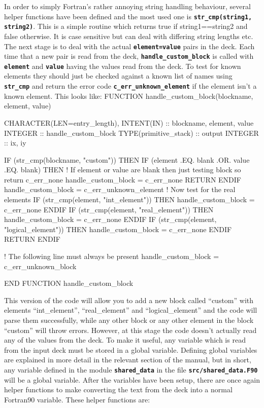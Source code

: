 \documentclass[12pt,a4paper]{article}
\newcommand{\inlinecode}[1]{{\color{warwickred} \bf\texttt{#1}}}
\newenvironment{boxverbatim}{\lboxverbatim{none}}{\endlboxverbatim}
\begin{document}
In order to simply Fortran's rather annoying string handling behaviour, several
helper functions have been defined and the most used one is
\inlinecode{str\_cmp(string1, string2)}. This is a simple routine which returns
true if string1==string2 and false otherwise. It is case sensitive but can
deal with differing string lengths etc. The next stage is to deal with the
actual \inlinecode{element=value} pairs in the deck. Each time that a new pair
is read from the deck, \inlinecode{handle\_custom\_block} is called with
\inlinecode{element} and \inlinecode{value} having the values read from the
deck. To test for known elements they should just be checked against a known
list of names using \inlinecode{str\_cmp} and return the error code
\inlinecode{c\_err\_unknown\_element} if the element isn't a known element. This
looks like:
\begin{boxverbatim}
FUNCTION handle_custom_block(blockname, element, value)

  CHARACTER(LEN=entry_length), INTENT(IN) :: blockname, element, value
  INTEGER :: handle_custom_block
  TYPE(primitive_stack) :: output
  INTEGER :: ix, iy

  IF (str_cmp(blockname, "custom")) THEN
    IF (element .EQ. blank .OR. value .EQ. blank) THEN
      ! If element or value are blank then just testing block so return c_err_none
      handle_custom_block = c_err_none
      RETURN
    ENDIF
    handle_custom_block = c_err_unknown_element
    ! Now test for the real elements
    IF (str_cmp(element, "int_element")) THEN
      handle_custom_block = c_err_none
    ENDIF
    IF (str_cmp(element, "real_element")) THEN
      handle_custom_block = c_err_none
    ENDIF
    IF (str_cmp(element, "logical_element")) THEN
      handle_custom_block = c_err_none
    ENDIF
    RETURN
  ENDIF

  ! The following line must always be present
  handle_custom_block = c_err_unknown_block

END FUNCTION handle_custom_block
\end{boxverbatim}

This version of the code will allow you to add a new block called ``custom''
with elements\linebreak
``int\_element'', ``real\_element'' and ``logical\_element'' and the
code will parse them successfully, while any other block or any other element
in the block ``custom'' will throw errors. However, at this stage the code
doesn't actually read any of the values from the deck. To make it useful, any
variable which is read from the input deck must be stored in a global
variable. Defining global variables are explained in more detail in the
relevant section of the manual, but in short, any variable defined in the
module \inlinecode{shared\_data} in the file \inlinecode{src/shared\_data.F90}
will be a global variable. After the variables have been setup, there are once
again helper functions to make converting the text from the deck into a normal
Fortran90 variable. These helper functions are:
\end{document}
